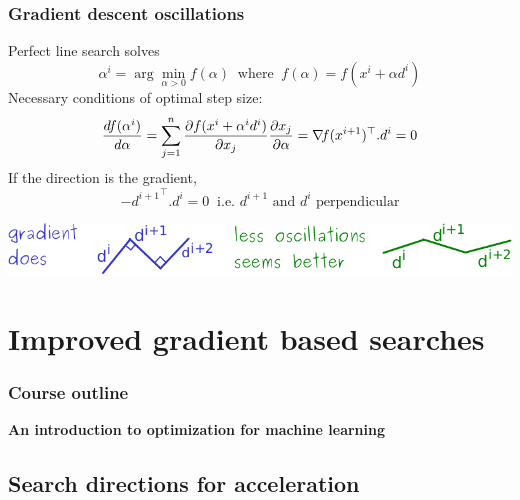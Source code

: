 \documentclass[12pt]{beamer}
\begin{document}
\begin{frame}
\frametitle{Gradient descent oscillations} 
Perfect line search solves
\begin{equation*}
\alpha^i = \arg\min_{\alpha>0} f(\alpha) ~\text{ where }~ f(\alpha) = f(x^i+\alpha d^i) 
\end{equation*}
Necessary conditions of optimal step size: 
\begin{equation*}
\frac{df(\alpha^i)}{d\alpha} = \sum_{j=1}^n \frac{\partial f(x^i + \alpha^i d^i)}{\partial x_j} \frac{\partial x_j}{\partial \alpha}
= \nabla\!{f}(x^{i+1})^\top . d^i = 0
\end{equation*}
If the direction is the gradient, 
\begin{equation*}
{-d^{i+1}}^\top . d^i = 0 ~\text{ i.e. } d^{i+1} \text{ and } d^i \text{ perpendicular}
\end{equation*}
\begin{center}
\includegraphics[width=\textwidth]{oscillations-crop.pdf} 
\end{center}
\end{frame}


\section{Improved gradient based searches}

\begin{frame}%
\frametitle{Course outline} 
\begin{multicols}{2}
\begin{center} \textbf{An introduction to optimization for machine learning} \end{center}
\tableofcontents[currentsection]
\end{multicols}
\end{frame}

\subsection{Search directions for acceleration}
\end{document}
